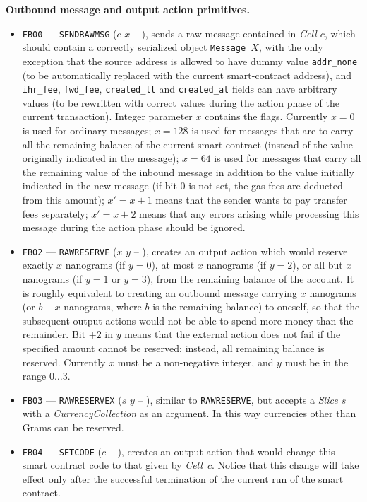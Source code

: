 \documentclass[12pt,oneside]{article}
\def\makepoint#1{\medbreak\noindent{\bf #1.\ }}
\def\nxsubpoint{\refstepcounter{subsubsection}%
  \smallbreak\makepoint{\thesubsubsection}}
\def\emb#1{\textbf{#1.}}
\begin{document}
\nxsubpoint\emb{Outbound message and output action primitives}
\begin{itemize}
\item {\tt FB00} --- {\tt SENDRAWMSG} ($c$ $x$ -- ), sends a raw message contained in {\em Cell $c$}, which should contain a correctly serialized object {\tt Message $X$}, with the only exception that the source address is allowed to have dummy value {\tt addr\_none} (to be automatically replaced with the current smart-contract address), and {\tt ihr\_fee}, {\tt fwd\_fee}, {\tt created\_lt} and {\tt created\_at} fields can have arbitrary values (to be rewritten with correct values during the action phase of the current transaction). Integer parameter $x$ contains the flags. Currently $x=0$ is used for ordinary messages; $x=128$ is used for messages that are to carry all the remaining balance of the current smart contract (instead of the value originally indicated in the message); $x=64$ is used for messages that carry all the remaining value of the inbound message in addition to the value initially indicated in the new message (if bit 0 is not set, the gas fees are deducted from this amount); $x'=x+1$ means that the sender wants to pay transfer fees separately; $x'=x+2$ means that any errors arising while processing this message during the action phase should be ignored.
\item {\tt FB02} --- {\tt RAWRESERVE} ($x$ $y$ -- ), creates an output action which would reserve exactly $x$ nanograms (if $y=0$), at most $x$ nanograms (if $y=2$), or all but $x$ nanograms (if $y=1$ or $y=3$), from the remaining balance of the account. It is roughly equivalent to creating an outbound message carrying $x$ nanograms (or $b-x$ nanograms, where $b$ is the remaining balance) to oneself, so that the subsequent output actions would not be able to spend more money than the remainder. Bit $+2$ in $y$ means that the external action does not fail if the specified amount cannot be reserved; instead, all remaining balance is reserved. Currently $x$ must be a non-negative integer, and $y$ must be in the range $0\ldots 3$.
\item {\tt FB03} --- {\tt RAWRESERVEX} ($s$ $y$ -- ), similar to {\tt RAWRESERVE}, but accepts a {\em Slice $s$} with a {\em CurrencyCollection\/} as an argument. In this way currencies other than Grams can be reserved.
\item {\tt FB04} --- {\tt SETCODE} ($c$ -- ), creates an output action that would change this smart contract code to that given by {\em Cell\/}~$c$. Notice that this change will take effect only after the successful termination of the current run of the smart contract.

\end{itemize}
\end{document}
